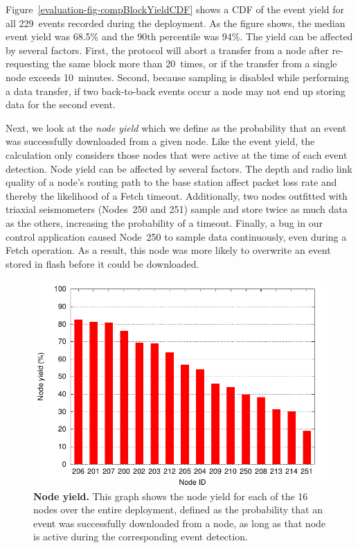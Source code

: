 Figure~\ref{evaluation-fig-compBlockYieldCDF} shows a CDF of the event yield
for all 229~events recorded during the deployment. As the figure shows, the
median event yield was 68.5\% and the 90th percentile was 94\%. The yield can
be affected by several factors. First, the protocol will abort a transfer
from a node after re-requesting the same block more than 20~times, or if the
transfer from a single node exceeds 10~minutes. Second, because sampling is
disabled while performing a data transfer, if two back-to-back events occur a
node may not end up storing data for the second event.

Next, we look at the \textit{node yield} which we define as the probability
that an event was successfully downloaded from a given node. Like the event
yield, the calculation only considers those nodes that were active at the
time of each event detection. Node yield can be affected by several factors.
The depth and radio link quality of a node's routing path to the base station
affect packet loss rate and thereby the likelihood of a Fetch timeout.
Additionally, two nodes outfitted with triaxial seismometers (Nodes~250 and
251) sample and store twice as much data as the others, increasing the
probability of a timeout. Finally, a bug in our control application caused
Node~250 to sample data continuously, even during a Fetch operation. As a
result, this node was more likely to overwrite an event stored in flash
before it could be downloaded.

\begin{figure}[t]
\begin{center}
\includegraphics[width=\hsize]{./3-evaluation/figs/performance/yields/nodeYield/nodeYieldOnly.pdf}
\end{center}
\caption{\textbf{Node yield.}
This graph shows the node yield for each of the 16 nodes over the entire
deployment, defined as the probability that an event was successfully
downloaded from a node, as long as that node is active during the
corresponding event detection.}
\label{evaluation-fig-nodeYield}
\end{figure}

